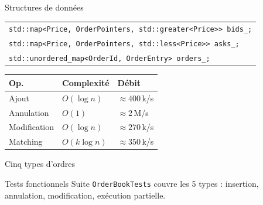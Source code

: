 \documentclass[11pt,aspectratio=169]{beamer}
\begin{document}
\begin{frame}{Structures de données}
        \footnotesize
        \begin{tabular}{@{}l@{}}
            \texttt{std::map<Price, OrderPointers, std::greater<Price>> bids\_;}\\
            \texttt{std::map<Price, OrderPointers, std::less<Price>>    asks\_;}\\
            \texttt{std::unordered\_map<OrderId, OrderEntry>             orders\_;}
        \end{tabular}

    \vspace{0.4cm}
        \begin{center}
        \scriptsize
        \begin{tabular}{lll}
            \toprule
            \textbf{Op.} & \textbf{Complexité} & \textbf{Débit} \\
            \midrule
            Ajout         & $O(\log n)$  & $\approx 400$\,k/s \\
            Annulation    & $O(1)$       & $\approx 2$\,M/s \\
            Modification  & $O(\log n)$  & $\approx 270$\,k/s \\
            Matching      & $O(k\log n)$ & $\approx 350$\,k/s \\
            \bottomrule
        \end{tabular}
        \end{center}
\end{frame}

\begin{frame}{Cinq types d'ordres}
    \centering

    \vspace{0.6cm}
    \begin{block}{Tests fonctionnels}
        Suite \texttt{OrderBookTests} couvre les 5 types : insertion, annulation, modification, exécution partielle.
    \end{block}
\end{frame}
\end{document}
